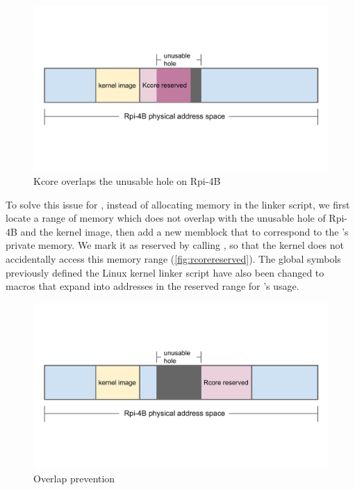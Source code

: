 \begin{figure}[hbtp]
    \includegraphics[scale=0.60]{figures/overlap.pdf}
    \caption{Kcore overlaps the unusable hole on Rpi-4B}
    \label{fig:overlap}
\end{figure}

To solve this issue for \rustsec{}, instead of allocating memory in the linker
script, we first locate a range of memory which does not overlap with the
unusable hole of Rpi-4B and the kernel image, then add a new memblock that to
correspond to the \rustcore{}'s private memory. We mark it as reserved by
calling , so that the kernel does not accidentally
access this memory range (\autoref{fig:rcorereserved}).
The global symbols previously defined the Linux kernel linker script have also
been changed to macros that expand into addresses in the reserved range for
\rustsec{}'s \rustcore{} usage.

\begin{figure}[H]
    \includegraphics[scale=0.60]{figures/rcore_reserved.pdf}
    \caption{Overlap prevention}
    \label{fig:rcorereserved}
\end{figure}

